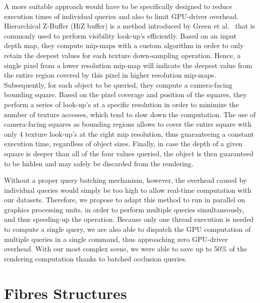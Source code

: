 A more suitable approach would have to be specifically designed to reduce execution times of individual queries and also to limit GPU-driver overhead.
Hierarchical Z-Buffer (HiZ buffer) is a method introduced by Green et al.~\cite{greene1993hierarchical} that is commonly used to perform visibility look-up's efficiently.
Based on an input depth map, they compute mip-maps with a custom algorithm in order to only retain the deepest values for each texture down-sampling operation.
Hence, a single pixel from a lower resolution mip-map will indicate the deepest value from the entire region covered by this pixel in higher resolution mip-maps.
Subsequently, for each object to be queried, they compute a camera-facing bounding square.
Based on the pixel coverage and position of the squares, they perform a series of look-up's at a specific resolution in order to minimize the number of texture accesses, which tend to slow down the computation.
The use of camera-facing squares as bounding regions allows to cover the entire square with only 4 texture look-up's at the right mip resolution, thus guaranteeing a constant execution time, regardless of object sizes.
Finally, in case the depth of a given square is deeper than all of the four values queried, the object is then guaranteed to be hidden and may safely be discarded from the rendering.

Without a proper query batching mechanism, however, the overhead caused by individual queries would simply be too high to allow real-time computation with our datasets.
Therefore, we propose to adapt this method to run in parallel on graphics processing units, in order to perform multiple queries simultaneously, and thus speeding-up the operation.
Because only one thread execution is needed to compute a single query, we are also able to dispatch the GPU computation of multiple queries in a single command, thus approaching zero GPU-driver overhead.
With our most complex scene, we were able to save up to 50\% of the rendering computation thanks to batched occlusion queries.

\section{Fibres Structures}


